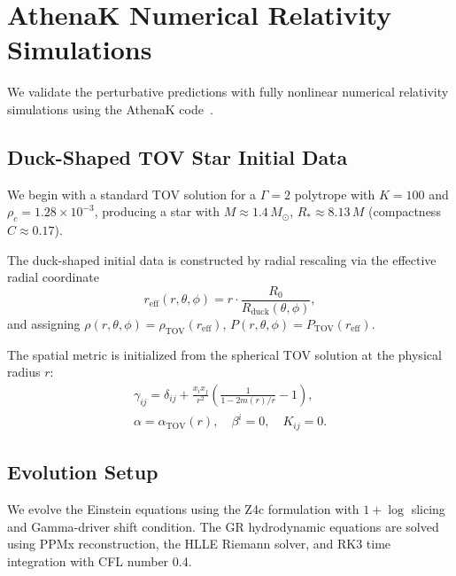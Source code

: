 \documentclass[aps,prd,twocolumn,superscriptaddress,nofootinbib]{revtex4-2}
\newcommand{\Msun}{M_\odot}
\begin{document}
\section{AthenaK Numerical Relativity Simulations}
\label{sec:athenak}

We validate the perturbative predictions with fully nonlinear numerical
relativity simulations using the AthenaK code~\cite{Stone2024, Zhu2024,
Fields2024}.


\subsection{Duck-Shaped TOV Star Initial Data}
\label{sec:tov_duck}

We begin with a standard TOV solution for a $\Gamma = 2$ polytrope with
$K = 100$ and $\rho_c = 1.28 \times 10^{-3}$, producing a star with
$M \approx 1.4\,\Msun$, $R_* \approx 8.13\,M$ (compactness
$C \approx 0.17$).

The duck-shaped initial data is constructed by radial rescaling via the
effective radial coordinate
\begin{equation}
r_{\mathrm{eff}}(r,\theta,\phi) = r \cdot
\frac{R_0}{R_{\mathrm{duck}}(\theta,\phi)},
\end{equation}
and assigning
$\rho(r,\theta,\phi) = \rho_{\mathrm{TOV}}(r_{\mathrm{eff}})$,
$P(r,\theta,\phi) = P_{\mathrm{TOV}}(r_{\mathrm{eff}})$.

The spatial metric is initialized from the spherical TOV solution at the
physical radius $r$:
\begin{multline}
\gamma_{ij} = \delta_{ij} + \frac{x_i x_j}{r^2}\left(\frac{1}{1 -
2m(r)/r} - 1\right), \\
\alpha = \alpha_{\mathrm{TOV}}(r), \quad
\beta^i = 0, \quad K_{ij} = 0.
\end{multline}


\subsection{Evolution Setup}
\label{sec:evolution}

We evolve the Einstein equations using the Z4c formulation with
$1{+}\log$ slicing and Gamma-driver shift condition.
The GR hydrodynamic equations are solved using PPMx reconstruction, the HLLE
Riemann solver, and RK3 time integration with CFL number 0.4.
\end{document}
